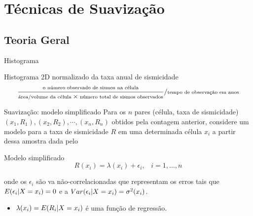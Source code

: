 \documentclass[ucs,8pt]{beamer}
\begin{document}
\section{Técnicas de Suavização}
\subsection{Teoria Geral}
\begin{frame}{Histograma}
	\begin{block}{Histograma 2D normalizado da taxa anual de sismicidade}
		\begin{equation}
		\scriptsize
			\ensuremath{
			\frac{\text{o número observado de sismos na célula}}
				 {\text{área/volume da célula} \times 
				  \text{número total de sismos observados}}
			/
			\text{tempo de observação em anos}
			}
		\label{eq:rate_count}
		\end{equation}
	\end{block}
\end{frame}


\begin{frame}{Suavização: modelo simplificado}
Para os $n$ pares (célula, taxa de sismicidade) $(x_1, R_1), (x_2, R_2), \cdots, (x_n, R_n)$
obtidos pela contagem anterior, considere um modelo para a taxa de sismicidade $R$ 
em uma determinada célula $x_i$ a partir dessa amostra dada pelo
	\begin{block}{Modelo simplificado}
		\begin{equation}
			\ensuremath{
				R(x_i) = \lambda(x_i) + \epsilon_i,\;\;\; i=1,\dots,n
			}
		\label{eq:rate_model}
		\end{equation}
	\end{block}
	onde os $\epsilon_i$ são \gls{va} não-correlacionadas que
	representam os erros tais que $E(\epsilon_i \arrowvert X = x_i) = 0$ 
	e a $Var(\epsilon_i \arrowvert X = x_i) = \sigma^2(x_i)$. 
	
	\begin{itemize}
	  \item $\lambda(x_i) = E(R_i \arrowvert X = x_i)$ é uma função de regressão.
	\end{itemize}
\end{frame}
\end{document}

